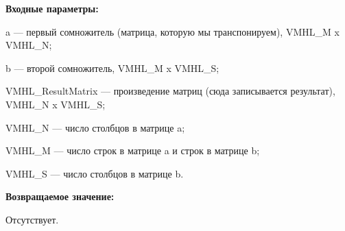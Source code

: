 \textbf{Входные параметры:}
 
a --- первый сомножитель (матрица, которую мы транспонируем), VMHL\_M x VMHL\_N;
 
b --- второй сомножитель, VMHL\_M x VMHL\_S;
 
VMHL\_ResultMatrix --- произведение матриц (сюда записывается результат), VMHL\_N x VMHL\_S;
 
VMHL\_N --- число столбцов в матрице a;
 
VMHL\_M --- число строк в матрице a и строк в матрице b;
 
VMHL\_S --- число столбцов в матрице b.

\textbf{Возвращаемое значение:}

Отсутствует.